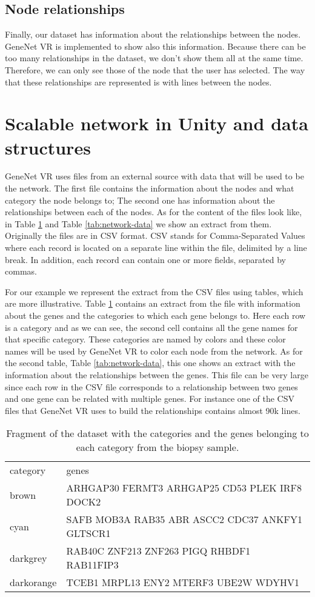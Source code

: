 \subsection{Node relationships}
Finally, our dataset has information about the relationships between the nodes. GeneNet VR is implemented to show also this information. Because there can be too many relationships in the dataset, we don't show them all at the same time. Therefore, we can only see those of the node that the user has selected. The way that these relationships are represented is with lines between the nodes.


\section{Scalable network in Unity and data structures}
GeneNet VR uses files from an external source with data that will be used to be the network. The first file contains the information about the nodes and what category the node belongs to; The second one has information about the relationships between each of the nodes. As for the content of the files look like, in Table \ref{tab:categories-data} and Table \ref{tab:network-data} we show an extract from them. Originally the files are in CSV format. CSV \cite{csv} stands for Comma-Separated Values where each record is located on a separate line within the file, delimited by a line break. In addition, each record can contain one or more fields, separated by commas.

For our example we represent the extract from the CSV files using tables, which are more illustrative. Table \ref{tab:categories-data} contains an extract from the file with information about the genes and the categories to which each gene belongs to. Here each row is a category and as we can see, the second cell contains all the gene names for that specific category. These categories are named by colors and these color names will be used by GeneNet VR to color each node from the network. As for the second table, Table \ref{tab:network-data}, this one shows an extract with the information about the relationships between the genes. This file can be very large since each row in the CSV file corresponds to a relationship between two genes and one gene can be related with multiple genes. For instance one of the CSV files that GeneNet VR uses to build the relationships contains almost 90k lines.

\begin{table}[h!]
\centering
\begin{tabular}{ll}
\hline
category & genes          \\
brown   & ARHGAP30 FERMT3 ARHGAP25 CD53 PLEK IRF8 DOCK2\\
cyan  & SAFB MOB3A RAB35 ABR ASCC2 CDC37 ANKFY1 GLTSCR1\\
darkgrey  & RAB40C ZNF213 ZNF263 PIGQ RHBDF1 RAB11FIP3\\
darkorange  & TCEB1 MRPL13 ENY2 MTERF3 UBE2W WDYHV1\\
\hline
\end{tabular}
\caption{Fragment of the dataset with the categories and the genes belonging to each category from the biopsy sample.}
\label{tab:categories-data}
\end{table}


